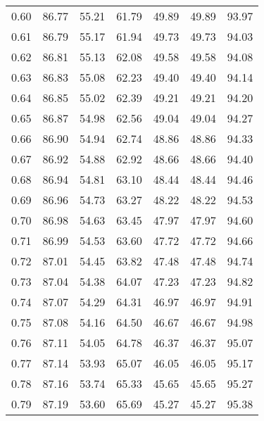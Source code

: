 \begin{tabular}{|c|c|c|c|c|c|c|}
      0.60 &     86.77 &     55.21 &      61.79 &   49.89 &      49.89 &         93.97 \\
      0.61 &     86.79 &     55.17 &      61.94 &   49.73 &      49.73 &         94.03 \\
      0.62 &     86.81 &     55.13 &      62.08 &   49.58 &      49.58 &         94.08 \\
      0.63 &     86.83 &     55.08 &      62.23 &   49.40 &      49.40 &         94.14 \\
      0.64 &     86.85 &     55.02 &      62.39 &   49.21 &      49.21 &         94.20 \\
      0.65 &     86.87 &     54.98 &      62.56 &   49.04 &      49.04 &         94.27 \\
      0.66 &     86.90 &     54.94 &      62.74 &   48.86 &      48.86 &         94.33 \\
      0.67 &     86.92 &     54.88 &      62.92 &   48.66 &      48.66 &         94.40 \\
      0.68 &     86.94 &     54.81 &      63.10 &   48.44 &      48.44 &         94.46 \\
      0.69 &     86.96 &     54.73 &      63.27 &   48.22 &      48.22 &         94.53 \\
      0.70 &     86.98 &     54.63 &      63.45 &   47.97 &      47.97 &         94.60 \\
      0.71 &     86.99 &     54.53 &      63.60 &   47.72 &      47.72 &         94.66 \\
      0.72 &     87.01 &     54.45 &      63.82 &   47.48 &      47.48 &         94.74 \\
      0.73 &     87.04 &     54.38 &      64.07 &   47.23 &      47.23 &         94.82 \\
      0.74 &     87.07 &     54.29 &      64.31 &   46.97 &      46.97 &         94.91 \\
      0.75 &     87.08 &     54.16 &      64.50 &   46.67 &      46.67 &         94.98 \\
      0.76 &     87.11 &     54.05 &      64.78 &   46.37 &      46.37 &         95.07 \\
      0.77 &     87.14 &     53.93 &      65.07 &   46.05 &      46.05 &         95.17 \\
      0.78 &     87.16 &     53.74 &      65.33 &   45.65 &      45.65 &         95.27 \\
      0.79 &     87.19 &     53.60 &      65.69 &   45.27 &      45.27 &         95.38 \\

\end{tabular}
